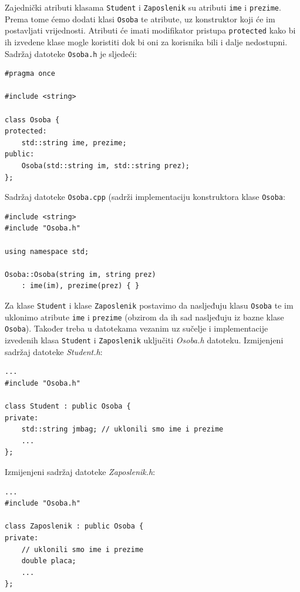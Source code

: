 \begin{rjesenje}
    Zajednički atributi klasama \texttt{Student} i \texttt{Zaposlenik}
    su atributi \texttt{ime} i \texttt{prezime}.
    Prema tome ćemo dodati klasi \texttt{Osoba} te atribute,
    uz konstruktor koji će im postavljati vrijednosti.
    Atributi će imati modifikator pristupa \texttt{protected}
    kako bi ih izvedene klase mogle koristiti
    dok bi oni za korisnika bili i dalje nedostupni.
    Sadržaj datoteke \texttt{Osoba.h} je sljedeći:

    \begin{verbatim}
#pragma once

#include <string>

class Osoba {
protected:
    std::string ime, prezime;
public:
    Osoba(std::string im, std::string prez);
};
    \end{verbatim}

    Sadržaj datoteke \texttt{Osoba.cpp}
    (sadrži implementaciju konstruktora klase \texttt{Osoba}:

\begin{verbatim}
#include <string>
#include "Osoba.h"

using namespace std;

Osoba::Osoba(string im, string prez) 
    : ime(im), prezime(prez) { }
\end{verbatim}

Za klase \texttt{Student} i klase \texttt{Zaposlenik} 
postavimo da nasljeđuju klasu \texttt{Osoba}
te im uklonimo
atribute \texttt{ime} i \texttt{prezime}
(obzirom da ih sad nasljeđuju iz bazne klase \texttt{Osoba}).
Također treba u datotekama vezanim uz sučelje i implementacije
izvedenih klasa \texttt{Student} i \texttt{Zaposlenik} uključiti \textit{Osoba.h} datoteku. 
Izmijenjeni sadržaj datoteke \textit{Student.h}:
\begin{verbatim}
...
#include "Osoba.h"

class Student : public Osoba {
private:
    std::string jmbag; // uklonili smo ime i prezime
    ...
};
\end{verbatim}

Izmijenjeni sadržaj datoteke \textit{Zaposlenik.h}:
\begin{verbatim}
...
#include "Osoba.h"

class Zaposlenik : public Osoba {
private:
    // uklonili smo ime i prezime
    double placa;
    ...
};
\end{verbatim}


\end{rjesenje}
